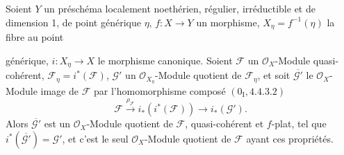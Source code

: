 \begin{proposition}[2.8.1]
\label{IV.2.8.1-fr}
Soient $Y$ un préschéma localement noethérien, régulier, irréductible et de
dimension 1, de point générique $\eta$, $f:X\to Y$ un morphisme,
$X_\eta=f^{-1}(\eta)$ la fibre au point

générique, $i:X_\eta\to X$ le morphisme canonique. Soient $\mathcal F$ un
$\mathcal O_X$-Module quasi-cohérent, $\mathcal F_\eta=i^*(\mathcal F)$,
$\mathcal G'$ un $\mathcal O_{X_\eta}$-Module quotient de $\mathcal F_\eta$,
et soit $\overline{\mathcal G'}$ le $\mathcal O_X$-Module image de $\mathcal F$
par l'homomorphisme composé $(0_{\mathrm I},4.4.3.2)$
\[
\mathcal F\xrightarrow{\rho_{\mathcal F}}i_*(i^*(\mathcal F))
\longrightarrow i_*(\mathcal G').
\]
Alors $\overline{\mathcal G'}$ est un $\mathcal O_X$-Module quotient de
$\mathcal F$, quasi-cohérent et $f$-plat, tel que
$i^*(\overline{\mathcal G'})=\mathcal G'$, et c'est le seul
$\mathcal O_X$-Module quotient de $\mathcal F$ ayant ces propriétés.
\end{proposition}

